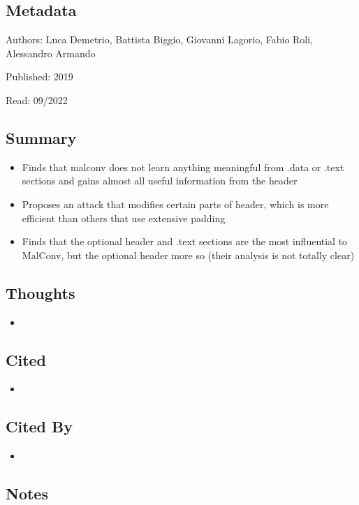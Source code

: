\documentclass{article}
\begin{document}
\subsection*{Metadata}

\noindent Authors: Luca Demetrio, Battista Biggio, Giovanni Lagorio, Fabio Roli, Alessandro Armando

\noindent Published: 2019

\noindent Read: 09/2022

\subsection*{Summary}
\begin{itemize}
	\item Finds that malconv does not learn anything meaningful from .data or .text sections and gains almost all useful information from the header
	\item Proposes an attack that modifies certain parts of header, which is more efficient than others that use extensive padding
	\item Finds that the optional header and .text sections are the most influential to MalConv, but the optional header more so (their analysis is not totally clear)
\end{itemize}

\subsection*{Thoughts}
\begin{itemize}
	\item
\end{itemize}

\subsection*{Cited}
\begin{itemize}
	\item
\end{itemize}

\subsection*{Cited By}
\begin{itemize}
	\item
\end{itemize}

\subsection*{Notes}
\end{document}
